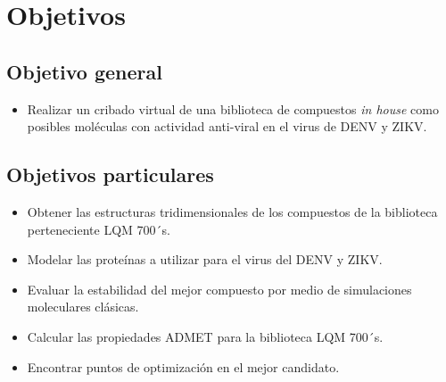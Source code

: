 \chapter{Objetivos}
 
 \section*{Objetivo general}
 \begin{itemize}
 \item[\tiny\faCircle]Realizar un cribado virtual de una biblioteca de compuestos \textit{in house} como posibles moléculas con actividad anti-viral en el virus de \ac{DENV} y \ac{ZIKV}.
 \end{itemize}

 \section*{Objetivos particulares}
 	\begin{itemize}
 		\item[\tiny\faCircle] Obtener las estructuras tridimensionales de los compuestos de la biblioteca perteneciente \ac{LQM} 700´s. 
 		\item[\tiny\faCircle] Modelar las proteínas a utilizar para el virus del \ac{DENV} y \ac{ZIKV}.
 	\item[\tiny\faCircle] Evaluar la estabilidad del mejor compuesto por medio de simulaciones moleculares clásicas.
 		\item[\tiny\faCircle] Calcular las propiedades \ac{ADMET} para la biblioteca \ac{LQM} 700´s. 
 		\item[\tiny\faCircle] Encontrar puntos de optimización en el mejor candidato. 
  	\end{itemize}